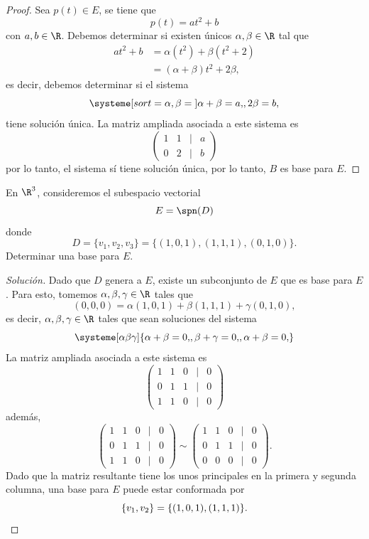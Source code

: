 \documentclass[a4,11pt]{aleph-notas}
\begin{document}
\begin{proof}
    Sea $p(t)\in E$, se tiene que
    \[
        p(t) = at^2+b
    \]
    con $a,b\in\R$. Debemos determinar si existen únicos $\alpha,\beta\in\R$ tal que
    \begin{align*}
        at^2+b 
            & = \alpha(t^2)+\beta(t^2+2)\\
            & = (\alpha+\beta)t^2 + 2\beta,
    \end{align*}
    es decir, debemos determinar si el sistema
    \[
        \systeme[sort={\alpha,\beta = {}}]{
            \alpha+\beta = a{,},
            2\beta = b{,}
        }
    \]
    tiene solución única. La matriz ampliada asociada a este sistema es
    \[
        \begin{pmatrix}
            1 & 1 & | & a\\
            0 & 2 & | & b
        \end{pmatrix}
    \]
    por lo tanto, el sistema sí tiene solución única, por lo tanto, $B$ es base para $E$.
\end{proof}


\begin{ejer}
    En $\R^3$, consideremos el subespacio vectorial
    \[
        E = \spn(D)
    \]
    donde
    \[
        D = \{v_1,v_2,v_3\} = \{(1,0,1), (1,1,1), (0,1,0)\}.
    \]
    Determinar una base para $E$.
\end{ejer}

\begin{proof}[Solución]
    Dado que $D$ genera a $E$, existe un subconjunto de $E$ que es base para $E$. Para esto, tomemos $\alpha,\beta,\gamma\in\R$ tales que
    \[
        (0,0,0) = \alpha(1,0,1)+\beta(1,1,1)+\gamma(0,1,0),
    \]
    es decir, $\alpha,\beta,\gamma\in\R$ tales que sean soluciones del sistema
    \[
        \systeme[\alpha\beta\gamma]{
        \alpha + \beta = 0{,},
        \beta+\gamma = 0{,},
        \alpha + \beta = 0{,}
        }
    \]
    La matriz ampliada asociada a este sistema es
    \[
        \begin{pmatrix}
            1 & 1 & 0 & | & 0\\
            0 & 1 & 1 & | & 0\\
            1 & 1 & 0 & | & 0
        \end{pmatrix}
    \]
    además,
    \[
        \begin{pmatrix}
            1 & 1 & 0 & | & 0\\
            0 & 1 & 1 & | & 0\\
            1 & 1 & 0 & | & 0
        \end{pmatrix}
        \sim
        \begin{pmatrix}
            1 & 1 & 0 & | & 0\\
            0 & 1 & 1 & | & 0\\
            0 & 0 & 0 & | & 0
        \end{pmatrix}.
    \]
    Dado que la matriz resultante tiene los unos principales en la primera y segunda columna, una base para $E$ puede estar conformada por
    \[
        \{v_1,v_2\}=\{(1,0,1), (1,1,1)\}.\qedhere
    \]
\end{proof}
\end{document}
